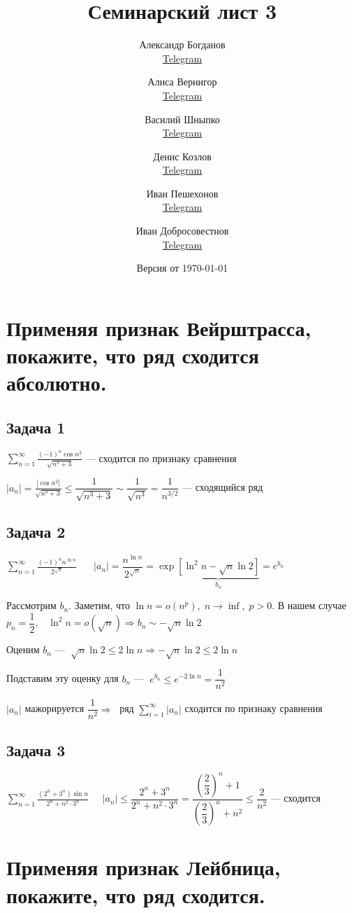 \documentclass[a4paper,fleqn]{article}
\title{Семинарский лист 3}
\author{
	Александр Богданов \\ \href{https://t.me/SphericalPotatoInVacuum}{Telegram} \and
	Алиса Вернигор     \\ \href{https://t.me/allisyonok}{Telegram} \and
	Василий Шныпко     \\ \href{https://t.me/yourvash}{Telegram} \and
	Денис Козлов       \\ \href{https://t.me/DKozl50}{Telegram} \and
	Иван Пешехонов     \\ \href{https://t.me/JohanDDC}{Telegram}\and
	Иван Добросовестнов \\ \href{https://t.me/ivankot13}{Telegram}
}
\date{Версия от {\ddmmyyyydate\today} \currenttime}
\begin{document}
	\maketitle
	\section*{Применяя признак Вейрштрасса, покажите, что ряд сходится абсолютно.}
	\subsection*{Задача 1}
		 $ \sum_{n=1}^{\infty} \frac{(-1)^{n} \cos n^{2}}{\sqrt{n^{3}+3}} $ --- сходится по признаку сравнения
		
		$ |a_n| = \frac{|\cos n^{2}|}{\sqrt{n^{3}+3}} \leq \dfrac{1}{\sqrt{n^{3}+3}} \sim \dfrac{1}{\sqrt{n^3}} = \dfrac{1}{n^{3/2}} $ --- сходящийся ряд
	
	\subsection*{Задача 2}
		$ \sum_{n=1}^{\infty} \frac{(-1)^{n} n^{\ln n}}{2^{\sqrt{n}}} $
		$\; \; \; \; \;  |a_n| = \dfrac{n^{\ln n}}{2^{\sqrt{n}}} = \exp \underbrace{\left[\ln^2 n - \sqrt{n}\ln 2\right]}_{b_n}  = e^{b_n}$
		
		Рассмотрим $ b_n $.
		Заметим, что $ \ln n  = o(n^p), \; n \to \inf, \; p>0$. В нашем случае $ p_n = \dfrac{1}{2}, \; \; \; \ln^2n = o(\sqrt{n}) \Rightarrow b_n \sim -\sqrt{n}\ln 2$ 
		
		Оценим $ b_n $   --- $ \; \sqrt{n}\ln2 \leq 2 \ln n \Rightarrow -\sqrt{n}\ln 2 \leq 2\ln n$
		
		Подставим эту оценку для $ b_n $ --- $\; e^{b_n} \leq e^{-2\ln n}  = \dfrac{1}{n^2}$ 
		
		$ |a_n| $ мажорируется $ \dfrac{1}{n^2} \Rightarrow \;$ ряд $ \sum_{i = 1}^{\infty} |a_n|$ сходится по признаку сравнения 
	\subsection*{Задача 3}
		$ \sum_{n=1}^{\infty} \frac{\left(2^{n}+3^{n}\right) \sin n}{2^{n}+n^{2} \cdot 3^{n}} \; \; \; \; \; |a_n| \leq \dfrac{2^n + 3^n}{2^n + n^2\cdot 3^n}  = \dfrac{\left(\dfrac{2}{3}\right)^n+1 }{\left(\dfrac{2}{3}\right)^n + n^2} \leq\dfrac{2}{n^2}$ --- сходится
	\section*{Применяя признак Лейбница, покажите, что ряд сходится.}
	
\end{document}
